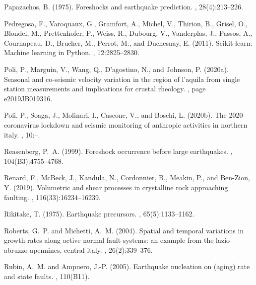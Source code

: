 \documentclass[a4paper,12pt,twoside]{article}
\begin{document}
\begin{thebibliography}{}
Papazachos, B. (1975).
\newblock Foreshocks and earthquake prediction.
, 28(4):213--226.

Pedregosa, F., Varoquaux, G., Gramfort, A., Michel, V., Thirion, B., Grisel,
  O., Blondel, M., Prettenhofer, P., Weiss, R., Dubourg, V., Vanderplas, J.,
  Passos, A., Cournapeau, D., Brucher, M., Perrot, M., and Duchesnay, E.
  (2011).
\newblock Scikit-learn: Machine learning in {P}ython.
, 12:2825--2830.

Poli, P., Marguin, V., Wang, Q., D’agostino, N., and Johnson, P. (2020a).
\newblock Seasonal and co-seismic velocity variation in the region of
  l’aquila from single station measurements and implications for crustal
  rheology.
, page
  e2019JB019316.

Poli, P., Soaga, J., Molinari, I., Cascone, V., and Boschi, L. (2020b).
\newblock The 2020 coronavirus lockdown and seismic monitoring of anthropic
  activities in northern italy.
, 10:--.
  
Reasenberg, P.~A. (1999).
\newblock Foreshock occurrence before large earthquakes.
,
  104(B3):4755--4768.
  
Renard, F., McBeck, J., Kandula, N., Cordonnier, B., Meakin, P., and Ben-Zion,
  Y. (2019).
\newblock Volumetric and shear processes in crystalline rock approaching
  faulting.
,
  116(33):16234--16239.

Rikitake, T. (1975).
\newblock Earthquake precursors.
,
  65(5):1133--1162.
  
Roberts, G.~P. and Michetti, A.~M. (2004).
\newblock Spatial and temporal variations in growth rates along active normal
  fault systems: an example from the lazio--abruzzo apennines, central italy.
, 26(2):339--376.

Rubin, A.~M. and Ampuero, J.-P. (2005).
\newblock Earthquake nucleation on (aging) rate and state faults.
, 110(B11).


\end{thebibliography}
\end{document}
